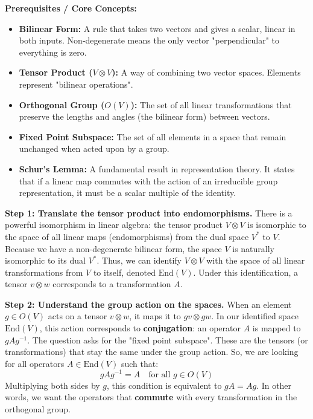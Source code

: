 \begin{solution}
\textbf{Prerequisites / Core Concepts:}
\begin{itemize}
    \item \textbf{Bilinear Form:} A rule that takes two vectors and gives a scalar, linear in both inputs. Non-degenerate means the only vector "perpendicular" to everything is zero.
    \item \textbf{Tensor Product ($V \otimes V$):} A way of combining two vector spaces. Elements represent "bilinear operations".
    \item \textbf{Orthogonal Group ($O(V)$):} The set of all linear transformations that preserve the lengths and angles (the bilinear form) between vectors.
    \item \textbf{Fixed Point Subspace:} The set of all elements in a space that remain unchanged when acted upon by a group.
    \item \textbf{Schur's Lemma:} A fundamental result in representation theory. It states that if a linear map commutes with the action of an irreducible group representation, it must be a scalar multiple of the identity.
\end{itemize}

\textbf{Step 1: Translate the tensor product into endomorphisms.}
There is a powerful isomorphism in linear algebra: the tensor product $V \otimes V$ is isomorphic to the space of all linear maps (endomorphisms) from the dual space $V^*$ to $V$. 
Because we have a non-degenerate bilinear form, the space $V$ is naturally isomorphic to its dual $V^*$. Thus, we can identify $V \otimes V$ with the space of all linear transformations from $V$ to itself, denoted $\text{End}(V)$.
Under this identification, a tensor $v \otimes w$ corresponds to a transformation $A$. 

\textbf{Step 2: Understand the group action on the spaces.}
When an element $g \in O(V)$ acts on a tensor $v \otimes w$, it maps it to $gv \otimes gw$.
In our identified space $\text{End}(V)$, this action corresponds to \textbf{conjugation}: an operator $A$ is mapped to $gAg^{-1}$. 
The question asks for the "fixed point subspace". These are the tensors (or transformations) that stay the same under the group action.
So, we are looking for all operators $A \in \text{End}(V)$ such that:
\[ gAg^{-1} = A \quad \text{for all } g \in O(V) \]
Multiplying both sides by $g$, this condition is equivalent to $gA = Ag$. In other words, we want the operators that \textbf{commute} with every transformation in the orthogonal group.


\end{solution}
